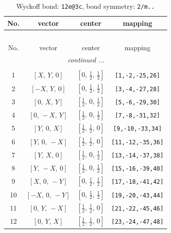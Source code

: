 \documentclass[fleqn,8pt]{jsarticle}
\begin{document}
\renewcommand{\arraystretch}{1.2}
\begin{longtable}{cccc}
\caption{Wyckoff bond: {\tt 12e@3c}, bond symmetry: {\tt 2/m..}}
 \\
 \hline \hline
No. & vector & center & mapping \\ \hline \endfirsthead

\multicolumn{3}{l}{\tablename\ \thetable{}} \\
 \hline \hline
No. & vector & center & mapping \\ \hline \endhead

 \hline \hline
\multicolumn{3}{r}{\footnotesize\it continued ...} \\ \endfoot

 \hline \hline
\multicolumn{3}{r}{} \\ \endlastfoot

1 & $\left[ X,\, Y,\, 0 \right]$ & $\left[ 0,\, \frac{1}{2},\, \frac{1}{2} \right]$ & {\tt [1,-2,-25,26]} \\ \hline
2 & $\left[ - X,\, Y,\, 0 \right]$ & $\left[ 0,\, \frac{1}{2},\, \frac{1}{2} \right]$ & {\tt [3,-4,-27,28]} \\ \hline
3 & $\left[ 0,\, X,\, Y \right]$ & $\left[ \frac{1}{2},\, 0,\, \frac{1}{2} \right]$ & {\tt [5,-6,-29,30]} \\ \hline
4 & $\left[ 0,\, - X,\, Y \right]$ & $\left[ \frac{1}{2},\, 0,\, \frac{1}{2} \right]$ & {\tt [7,-8,-31,32]} \\ \hline
5 & $\left[ Y,\, 0,\, X \right]$ & $\left[ \frac{1}{2},\, \frac{1}{2},\, 0 \right]$ & {\tt [9,-10,-33,34]} \\ \hline
6 & $\left[ Y,\, 0,\, - X \right]$ & $\left[ \frac{1}{2},\, \frac{1}{2},\, 0 \right]$ & {\tt [11,-12,-35,36]} \\ \hline
7 & $\left[ Y,\, X,\, 0 \right]$ & $\left[ \frac{1}{2},\, 0,\, \frac{1}{2} \right]$ & {\tt [13,-14,-37,38]} \\ \hline
8 & $\left[ Y,\, - X,\, 0 \right]$ & $\left[ \frac{1}{2},\, 0,\, \frac{1}{2} \right]$ & {\tt [15,-16,-39,40]} \\ \hline
9 & $\left[ X,\, 0,\, - Y \right]$ & $\left[ 0,\, \frac{1}{2},\, \frac{1}{2} \right]$ & {\tt [17,-18,-41,42]} \\ \hline
10 & $\left[ - X,\, 0,\, - Y \right]$ & $\left[ 0,\, \frac{1}{2},\, \frac{1}{2} \right]$ & {\tt [19,-20,-43,44]} \\ \hline
11 & $\left[ 0,\, Y,\, - X \right]$ & $\left[ \frac{1}{2},\, \frac{1}{2},\, 0 \right]$ & {\tt [21,-22,-45,46]} \\ \hline
12 & $\left[ 0,\, Y,\, X \right]$ & $\left[ \frac{1}{2},\, \frac{1}{2},\, 0 \right]$ & {\tt [23,-24,-47,48]} \\
\end{longtable}
\end{document}

